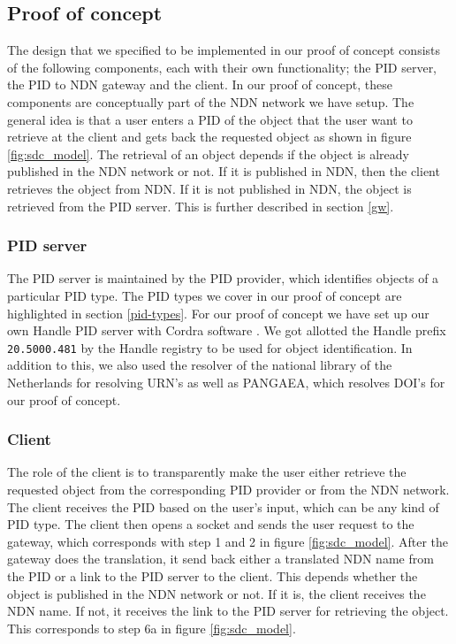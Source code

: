 \subsection{Proof of concept}
The design that we specified to be implemented in our proof of concept consists of the following components, each with their own functionality; the PID server, the PID to NDN gateway and the client. In our proof of concept, these components are conceptually part of the NDN network we have setup. The general idea is that a user enters a PID of the object that the user want to retrieve at the client and gets back the requested object as shown in figure \ref{fig:sdc_model}. The retrieval of an object depends if the object is already published in the NDN network or not. If it is published in NDN, then the client retrieves the object from NDN. If it is not published in NDN, the object is retrieved from the PID server. This is further described in section \ref{gw}.  

\subsubsection{PID server}
The PID server is maintained by the PID provider, which identifies objects of a particular PID type. The PID types we cover in our proof of concept are highlighted in section \ref{pid-types}. For our proof of concept we have set up our own Handle PID server with Cordra software \cite{cor}. We got allotted the Handle prefix \texttt{20.5000.481} by the Handle registry to be used for object identification. In addition to this, we also used the resolver of the national library of the Netherlands for resolving URN's as well as PANGAEA, which resolves DOI's for our proof of concept.

\subsubsection{Client}\label{client}
The role of the client is to transparently make the user either retrieve the requested object from the corresponding PID provider or from the NDN network. The client receives the PID based on the user's input, which can be any kind of PID type. The client then opens a socket and sends the user request to the gateway, which corresponds with step 1 and 2 in figure \ref{fig:sdc_model}. After the gateway does the translation, it send back either a translated NDN name from the PID or a link to the PID server to the client. This depends whether the object is published in the NDN network or not. If it is, the client receives the NDN name. If not, it receives the link to the PID server for retrieving the object. This corresponds to step 6a in figure \ref{fig:sdc_model}.

